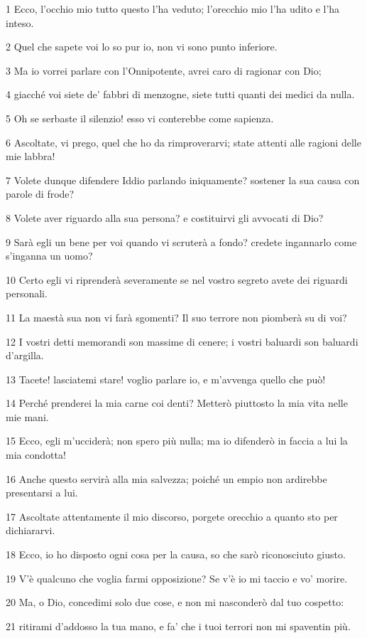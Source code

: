 \par 1 Ecco, l'occhio mio tutto questo l'ha veduto; l'orecchio mio l'ha udito e l'ha inteso.
\par 2 Quel che sapete voi lo so pur io, non vi sono punto inferiore.
\par 3 Ma io vorrei parlare con l'Onnipotente, avrei caro di ragionar con Dio;
\par 4 giacché voi siete de' fabbri di menzogne, siete tutti quanti dei medici da nulla.
\par 5 Oh se serbaste il silenzio! esso vi conterebbe come sapienza.
\par 6 Ascoltate, vi prego, quel che ho da rimproverarvi; state attenti alle ragioni delle mie labbra!
\par 7 Volete dunque difendere Iddio parlando iniquamente? sostener la sua causa con parole di frode?
\par 8 Volete aver riguardo alla sua persona? e costituirvi gli avvocati di Dio?
\par 9 Sarà egli un bene per voi quando vi scruterà a fondo? credete ingannarlo come s'inganna un uomo?
\par 10 Certo egli vi riprenderà severamente se nel vostro segreto avete dei riguardi personali.
\par 11 La maestà sua non vi farà sgomenti? Il suo terrore non piomberà su di voi?
\par 12 I vostri detti memorandi son massime di cenere; i vostri baluardi son baluardi d'argilla.
\par 13 Tacete! lasciatemi stare! voglio parlare io, e m'avvenga quello che può!
\par 14 Perché prenderei la mia carne coi denti? Metterò piuttosto la mia vita nelle mie mani.
\par 15 Ecco, egli m'ucciderà; non spero più nulla; ma io difenderò in faccia a lui la mia condotta!
\par 16 Anche questo servirà alla mia salvezza; poiché un empio non ardirebbe presentarsi a lui.
\par 17 Ascoltate attentamente il mio discorso, porgete orecchio a quanto sto per dichiararvi.
\par 18 Ecco, io ho disposto ogni cosa per la causa, so che sarò riconosciuto giusto.
\par 19 V'è qualcuno che voglia farmi opposizione? Se v'è io mi taccio e vo' morire.
\par 20 Ma, o Dio, concedimi solo due cose, e non mi nasconderò dal tuo cospetto:
\par 21 ritirami d'addosso la tua mano, e fa' che i tuoi terrori non mi spaventin più.
